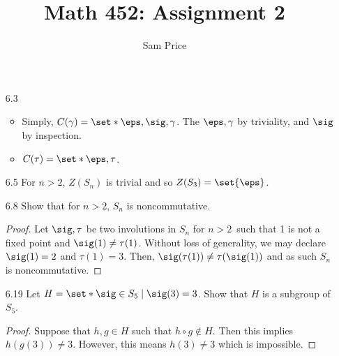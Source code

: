 \documentclass{article}
\author{Sam Price}
\date{}
\title{Math 452: Assignment 2}
\begin{document}
\maketitle

\begin{enumerate}
  \item[6.3\rparen]
        \begin{itemize}
          \item Simply, $C(\gamma) = \set*{\eps, \sig, \gamma}$.
                The $\eps, \gamma$ by triviality, and $\sig$ by inspection.
          \item $C(\tau) = \set*{\eps, \tau}$.
        \end{itemize}
  \item[6.5\rparen] For $n > 2$, $Z(S_{n})$ is trivial and so $Z(S_{3}) = \set{\eps}$.
  \item[6.8\rparen] Show that for $n > 2$, $S_{n}$ is noncommutative.
        \begin{proof}
          Let $\sig, \tau$ be two involutions in $S_{n}$ for $n > 2$\, such that 1 is not a fixed
          point and $\sig(1) \ne \tau(1)$.
          Without loss of generality, we may declare $\sig(1) = 2$ and $\tau(1) = 3$.
          Then, $\sig(\tau(1)) \ne \tau(\sig(1))$ and as such $S_{n}$ is noncommutative.
        \end{proof}
  \item[6.19\rparen] Let $H = \set*{ \sig \in S_{5} \mid \sig(3) = 3 }$.
        Show that $H$ is a subgroup of $S_{5}$.
        \begin{proof}
          Suppose that $h, g \in H$ such that $h \circ g \notin H$. Then this implies $h(g(3)) \ne 3$.
          However, this means $h(3) \ne 3$ which is impossible.


\end{proof}
\end{enumerate}
\end{document}
